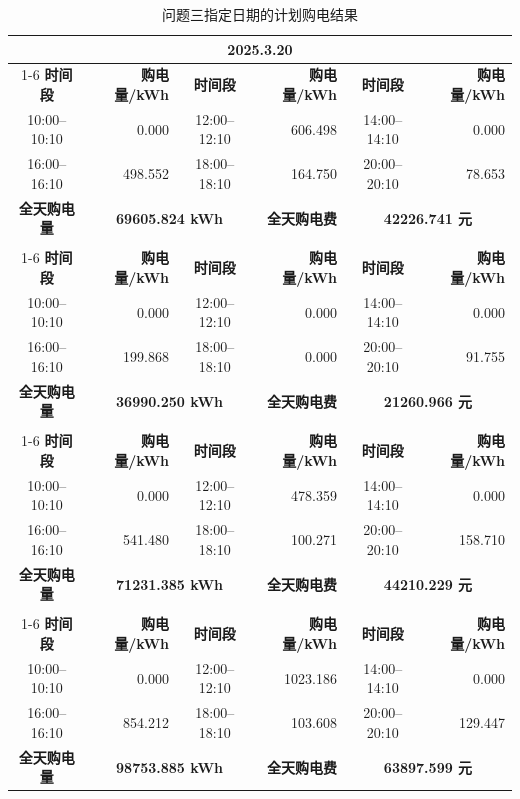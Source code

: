 \begin{table}[H]
\centering\small
\caption{问题三指定日期的计划购电结果}\label{tab:q3-specified-plan}
\renewcommand{\arraystretch}{0.82}
\begin{tabular*}{\textwidth}{@{\extracolsep{\fill}}crcrcr@{}}
\toprule
\multicolumn{6}{c}{\textbf{2025.3.20}} \\
\cmidrule(lr){1-6}
\textbf{时间段} & \textbf{购电量/kWh} & \textbf{时间段} & \textbf{购电量/kWh} & \textbf{时间段} & \textbf{购电量/kWh} \\
10:00--10:10 & 0.000 & 12:00--12:10 & 606.498 & 14:00--14:10 & 0.000 \\
16:00--16:10 & 498.552 & 18:00--18:10 & 164.750 & 20:00--20:10 & 78.653 \\
\midrule
\textbf{全天购电量} & \multicolumn{2}{c}{\textbf{69605.824 kWh}} & \textbf{全天购电费} & \multicolumn{2}{c}{\textbf{42226.741 元}} \\
\addlinespace[4pt]
\multicolumn{6}{c}{\textbf{2025.6.21}} \\
\cmidrule(lr){1-6}
\textbf{时间段} & \textbf{购电量/kWh} & \textbf{时间段} & \textbf{购电量/kWh} & \textbf{时间段} & \textbf{购电量/kWh} \\
10:00--10:10 & 0.000 & 12:00--12:10 & 0.000 & 14:00--14:10 & 0.000 \\
16:00--16:10 & 199.868 & 18:00--18:10 & 0.000 & 20:00--20:10 & 91.755 \\
\midrule
\textbf{全天购电量} & \multicolumn{2}{c}{\textbf{36990.250 kWh}} & \textbf{全天购电费} & \multicolumn{2}{c}{\textbf{21260.966 元}} \\
\addlinespace[4pt]
\multicolumn{6}{c}{\textbf{2025.9.23}} \\
\cmidrule(lr){1-6}
\textbf{时间段} & \textbf{购电量/kWh} & \textbf{时间段} & \textbf{购电量/kWh} & \textbf{时间段} & \textbf{购电量/kWh} \\
10:00--10:10 & 0.000 & 12:00--12:10 & 478.359 & 14:00--14:10 & 0.000 \\
16:00--16:10 & 541.480 & 18:00--18:10 & 100.271 & 20:00--20:10 & 158.710 \\
\midrule
\textbf{全天购电量} & \multicolumn{2}{c}{\textbf{71231.385 kWh}} & \textbf{全天购电费} & \multicolumn{2}{c}{\textbf{44210.229 元}} \\
\addlinespace[4pt]
\multicolumn{6}{c}{\textbf{2025.12.21}} \\
\cmidrule(lr){1-6}
\textbf{时间段} & \textbf{购电量/kWh} & \textbf{时间段} & \textbf{购电量/kWh} & \textbf{时间段} & \textbf{购电量/kWh} \\
10:00--10:10 & 0.000 & 12:00--12:10 & 1023.186 & 14:00--14:10 & 0.000 \\
16:00--16:10 & 854.212 & 18:00--18:10 & 103.608 & 20:00--20:10 & 129.447 \\
\midrule
\textbf{全天购电量} & \multicolumn{2}{c}{\textbf{98753.885 kWh}} & \textbf{全天购电费} & \multicolumn{2}{c}{\textbf{63897.599 元}} \\
\bottomrule
\end{tabular*}
\end{table}

